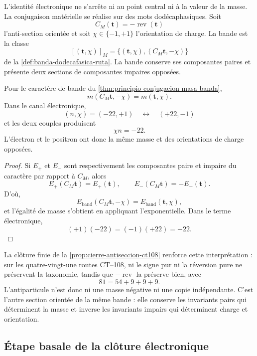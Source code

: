 L'identité électronique ne s'arrête ni au point central ni à la valeur de la
masse. La conjugaison matérielle se réalise sur des mots dodécaphasiques. Soit
\[
 C_M(\mathbf t)=-\operatorname{rev}(\mathbf t)
\]
l'anti-section orientée et soit
\(\chi\in\{-1,+1\}\) l'orientation de charge. La bande est la classe
\[
 [(\mathbf t,\chi)]_M
 =
 \{(\mathbf t,\chi),(C_M\mathbf t,-\chi)\}
\]
de la \cref{def:banda-dodecafasica-ruta}. La bande conserve ses composantes
paires et présente deux sections de composantes impaires opposées.

\begin{theorem}
\label{thm:electron-positron-biografia-rev6}
Pour le caractère de bande du
\cref{thm:principio-conjugacion-masa-banda},
\[
 m(C_M\mathbf t,-\chi)=m(\mathbf t,\chi).
\]
Dans le canal électronique,
\[
 (n,\chi)=(-22,+1)
 \quad\longleftrightarrow\quad
 (+22,-1)
\]
et les deux couples produisent
\[
 \chi n=-22.
\]
L'électron et le positron ont donc la même masse et des orientations de
charge opposées.
\end{theorem}

\begin{proof}
Si \(E_+\) et \(E_-\) sont respectivement les composantes paire et impaire du
caractère par rapport à \(C_M\), alors
\[
 E_+(C_M\mathbf t)=E_+(\mathbf t),
 \qquad
 E_-(C_M\mathbf t)=-E_-(\mathbf t).
\]
D'où,
\[
 E_{\mathrm{band}}(C_M\mathbf t,-\chi)
 =
 E_{\mathrm{band}}(\mathbf t,\chi),
\]
et l'égalité de masse s'obtient en appliquant l'exponentielle. Dans le terme
électronique,
\[
 (+1)(-22)=(-1)(+22)=-22.
\]
\end{proof}

La clôture finie de la \cref{prop:cierre-antiseccion-ct108} renforce cette
interprétation : sur les quatre-vingt-une routes CT--108, ni le signe pur ni
la réversion pure ne préservent la taxonomie, tandis que
\(-\operatorname{rev}\) la préserve bien, avec
\[
 81=54+9+9+9.
\]
L'antiparticule n'est donc ni une masse négative ni une copie
indépendante. C'est l'autre section orientée de la même bande : elle conserve les
invariants pairs qui déterminent la masse et inverse les invariants impairs qui
déterminent charge et orientation.

\subsection{Étape basale de la clôture électronique}

